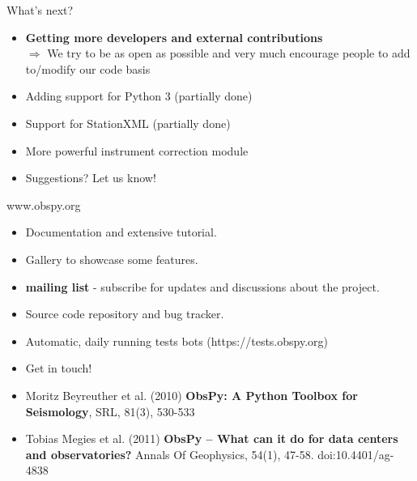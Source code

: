 \documentclass[handout]{beamer}
\begin{document}
\begin{frame}[plain]{What's next?}
    \begin{itemize}
            \item \textbf{Getting more developers and external contributions} \\ $\Rightarrow$ We try to be as open as possible and very much encourage people to add to/modify our code basis
            \item Adding support for Python 3 (partially done)
            \item Support for StationXML (partially done)
            \item More powerful instrument correction module
            \item Suggestions? Let us know!
    \end{itemize}
\end{frame}


\begin{frame}[plain]{www.obspy.org}
    \begin{itemize}
        \item Documentation and extensive tutorial.
        \item Gallery to showcase some features.
        \item \textbf{mailing list} - subscribe for updates and discussions about the project.
        \item Source code repository and bug tracker.
        \item Automatic, daily running tests bots (https://tests.obspy.org)
        \item Get in touch!
    \end{itemize}

    \vspace{2em}

    \small
    \begin{itemize}
        \item Moritz Beyreuther et al. (2010) \textbf{ObsPy: A Python Toolbox for Seismology}, SRL, 81(3), 530-533
        \item Tobias Megies et al. (2011) \textbf{ObsPy – What can it do for data centers and observatories?} Annals Of Geophysics, 54(1), 47-58. doi:10.4401/ag-4838
    \end{itemize}
\end{frame}
\end{document}
